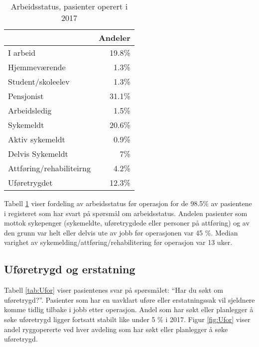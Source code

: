 \documentclass [norsk,a4paper,twoside]{article}\usepackage[]{graphicx}\usepackage[]{color}
\begin{document}
\begin{table}[ht]
\centering
\begin{tabular}{lr}
  \hline
 & Andeler \\ 
  \hline
I arbeid & 19.8\% \\ 
  Hjemmeværende & 1.3\% \\ 
  Student/skoleelev & 1.3\% \\ 
  Pensjonist & 31.1\% \\ 
  Arbeidsledig & 1.5\% \\ 
  Sykemeldt & 20.6\% \\ 
  Aktiv sykemeldt & 0.9\% \\ 
  Delvis Sykemeldt & 7\% \\ 
  Attføring/rehabiliteirng & 4.2\% \\ 
  Uføretrygdet & 12.3\% \\ 
   \hline
\end{tabular}
\caption{Arbeidsstatus, pasienter operert i 2017} 
\label{tab:Arb}
\end{table}


Tabell \ref{tab:Arb} viser fordeling av arbeidsstatus før operasjon for de 98.5\% 
av pasientene i registeret som har svart på spørsmål om arbeidsstatus. 
Andelen pasienter som mottok sykepenger (sykemeldte, uføretrygdede eller personer 
på attføring) og av den grunn var helt eller delvis ute av jobb før operasjonen var 
45 \%. 
Median varighet av sykemelding/attføring/rehabilitering  før operasjon var 
13 uker.




\subsection{Uføretrygd og erstatning }

Tabell \ref{tab:Ufor} viser pasientenes svar på spørsmålet: ``Har du søkt om uføretrygd?''.
Pasienter som har en uavklart uføre eller erstatningssak vil sjeldnere komme tidlig tilbake i jobb etter operasjon.
Andel som har søkt eller planlegger å søke uføretrygd ligger fortsatt stabilt like under 5 \% i 2017. 
Figur \ref{fig:Ufor} viser andel ryggopererte ved hver avdeling som har søkt eller planlegger å søke uføretrygd.
\end{document}
